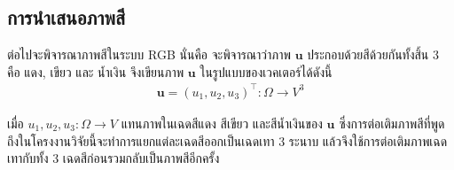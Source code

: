 \subsection{การนำเสนอภาพสี}

\hspace{1cm} ต่อไปจะพิจารณาภาพสีในระบบ RGB นั่นคือ จะพิจารณาว่าภาพ $\boldsymbol{u}$ ประกอบด้วยสีด้วยกันทั้งสิ้น 3 คือ แดง, เขียว และ น้ำเงิน จึงเขียนภาพ $\boldsymbol{u}$  ในรูปแบบของเวคเตอร์ได้ดังนี้
\begin{align*}
	\boldsymbol{u} = (u_1,u_2,u_3)^{\top} : \Omega  \rightarrow V^3	
\end{align*}

\noindent เมื่อ $u_1,u_2,u_3: \Omega  \rightarrow V$ แทนภาพในเฉดสีแดง สีเขียว และสีน้ำเงินของ $\boldsymbol{u}$ ซึ่งการต่อเติมภาพสีที่พูดถึงในโครงงานวิจัยนี้จะทำการแยกแต่ละเฉดสีออกเป็นเฉดเทา 3 ระนาบ แล้วจึงใช้การต่อเติมภาพเฉดเทากับทั้ง 3 เฉดสีก่อนรวมกลับเป็นภาพสีอีกครั้ง

